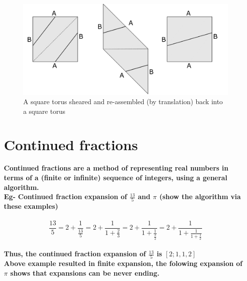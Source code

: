\documentclass{report}
\begin{document}


\begin{figure} 
\begin{center}
\includegraphics[scale=0.3]{2.8}
\caption{A square torus sheared and re-assembled (by translation) back into a square torus}
\end{center}
\end{figure}

\pagebreak

\section{Continued fractions}

\paragraph{Continued fractions are a method of representing real numbers in terms of a (finite or infinite) sequence of integers, using a general algorithm. \\ Eg- Continued fraction expansion of $\frac{13}{5}$ and $\pi$ (show the algorithm via these examples)}


\begin{displaymath}
{\frac{13}{5} = 2 + \frac{1}{\frac{13}{5}} = 2+ \frac{1}{1 + \frac{2}{3}} = 2+ \frac{1}{1 + \frac{1}{\frac{3}{2}}} = 2+ \frac{1}{1 + \frac{1}{1 + \frac{1}{2}}}}
\end{displaymath}

 
\paragraph{Thus, the continued fraction expansion of $\frac{13}{5}$ is $[2;1,1,2]$ \\ Above example resulted in finite expansion, the folowing expansion of $\pi$ shows that expansions can be never ending.}
\end{document}
